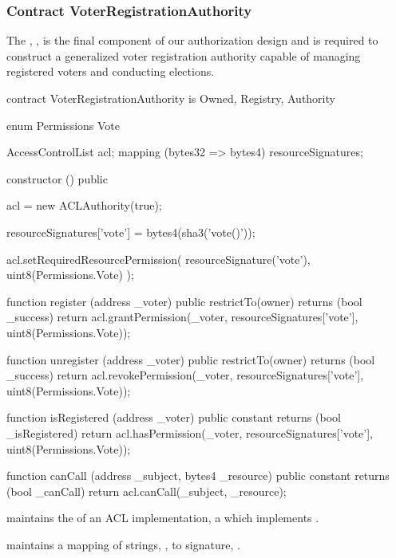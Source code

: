 \subsubsection{Contract VoterRegistrationAuthority}

The , , is the final
component of our authorization design and is required to construct a generalized
voter registration authority capable of managing registered voters and
conducting elections.

\begin{solidity}
contract VoterRegistrationAuthority is Owned, Registry, Authority {
  enum Permissions {
    Vote
  }

  AccessControlList acl;
  mapping (bytes32 => bytes4) resourceSignatures;

  constructor () public {
    acl = new ACLAuthority(true);

    resourceSignatures['vote'] = bytes4(sha3('vote()'));

    acl.setRequiredResourcePermission(
      resourceSignature('vote'),
      uint8(Permissions.Vote)
    );
  }

  function register (address _voter) public restrictTo(owner) returns (bool _success) {
    return acl.grantPermission(_voter, resourceSignatures['vote'], uint8(Permissions.Vote));
  }

  function unregister (address _voter) public restrictTo(owner) returns (bool _success) {
    return acl.revokePermission(_voter, resourceSignatures['vote'], uint8(Permissions.Vote));
  }

  function isRegistered (address _voter) public constant returns (bool _isRegistered) {
    return acl.hasPermission(_voter, resourceSignatures['vote'], uint8(Permissions.Vote));
  }

  function canCall (address _subject, bytes4 _resource) public constant returns (bool _canCall) {
    return acl.canCall(_subject, _resource);
  }
}
\end{solidity}


\begin{state}
  \item \attributes

  \begin{public}
    \item {} maintains the  of an ACL
      implementation, a  which implements .

    \item {} maintains a
      mapping of strings, , to  signature,
      .
  \end{public}
\end{state}


